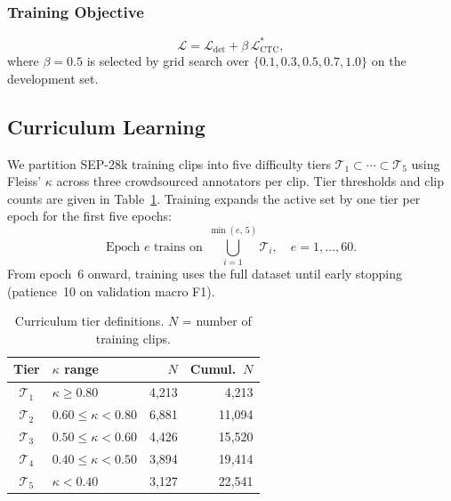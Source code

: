 \documentclass[cameraready]{Interspeech}
\begin{document}
\subsubsection{Training Objective}

\begin{equation}
    \mathcal{L} = \mathcal{L}_{\text{det}} + \beta \,
    \mathcal{L}_{\text{CTC}}^{*},
    \label{eq:total_loss}
\end{equation}
where $\beta=0.5$ is selected by grid search over
$\{0.1, 0.3, 0.5, 0.7, 1.0\}$ on the development set.

\subsection{Curriculum Learning}
\label{sec:curriculum}

We partition SEP-28k training clips into five difficulty tiers
$\mathcal{T}_1 \subset \cdots \subset \mathcal{T}_5$ using Fleiss' $\kappa$
across three crowdsourced annotators per clip. Tier thresholds and clip counts
are given in Table~\ref{tab:tiers}. Training expands the active set by one tier
per epoch for the first five epochs:
\begin{equation}
    \text{Epoch } e \text{ trains on }
    \bigcup_{i=1}^{\min(e,\,5)} \mathcal{T}_i, \quad e = 1,\ldots,60.
    \label{eq:curriculum}
\end{equation}
From epoch~6 onward, training uses the full dataset until early stopping
(patience~10 on validation macro F1).

\begin{table}[t]
    \centering
    \caption{Curriculum tier definitions. $N$ = number of training clips.}
    \label{tab:tiers}
    \renewcommand{\arraystretch}{1.05}
    \setlength{\tabcolsep}{4pt}
    \begin{tabular}{clrr}
        \toprule
        \textbf{Tier} & \textbf{$\kappa$ range}
            & \textbf{$N$} & \textbf{Cumul.\ $N$} \\
        \midrule
        $\mathcal{T}_1$ & $\kappa \geq 0.80$              & 4{,}213 &  4{,}213 \\
        $\mathcal{T}_2$ & $0.60 \leq \kappa < 0.80$       & 6{,}881 & 11{,}094 \\
        $\mathcal{T}_3$ & $0.50 \leq \kappa < 0.60$       & 4{,}426 & 15{,}520 \\
        $\mathcal{T}_4$ & $0.40 \leq \kappa < 0.50$       & 3{,}894 & 19{,}414 \\
        $\mathcal{T}_5$ & $\kappa < 0.40$                  & 3{,}127 & 22{,}541 \\
        \bottomrule
    \end{tabular}
\end{table}
\end{document}
